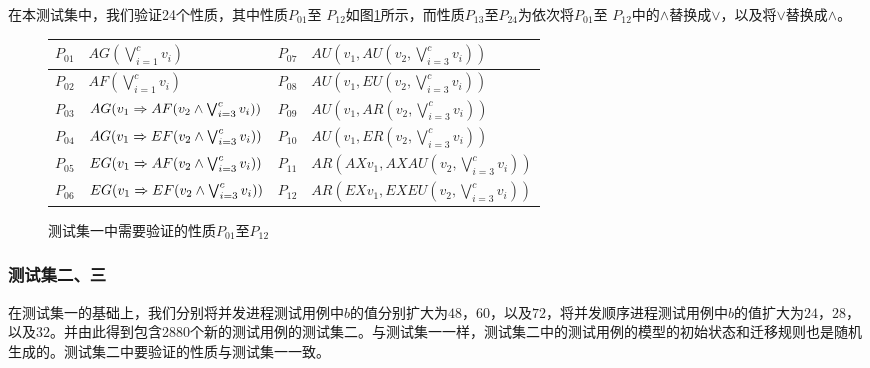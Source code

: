 在本测试集中，我们验证24个\CTL{}性质，其中性质$P_{01}$至 $P_{12}$如图\ref{fig:properties}所示，而性质$P_{13}$至$P_{24}$为依次将$P_{01}$至 $P_{12}$中的$\wedge$替换成$\vee$，以及将$\vee$替换成$\wedge$。


\begin{figure}[!h]
	\centering
	{
		\begin{tabular}{|l|l||l|l|}
			\hline
			$P_{01}$& $AG(\bigvee^c_{i=1}v_i)$ & $P_{07}$& $AU(v_1, AU(v_2, \bigvee^c_{i=3}v_i))$\\
			\hline
			$P_{02}$& $AF(\bigvee^c_{i=1}v_i)$ & $P_{08}$ & $AU(v_1, EU(v_2, \bigvee^c_{i=3}v_i))$\\
			\hline
			$P_{03}$& $AG(v_1 \Rightarrow AF(v_2\wedge \bigvee^c_{i=3}v_i))$ & $P_{09}$& $AU(v_1, AR(v_2, \bigvee^c_{i=3}v_i))$\\
			
			\hline
			$P_{04}$& $AG(v_1 \Rightarrow EF(v_2\wedge \bigvee^c_{i=3}v_i))$ & $P_{10}$& $AU(v_1, ER(v_2, \bigvee^c_{i=3}v_i))$\\
			
			\hline
			$P_{05}$& $EG(v_1 \Rightarrow AF(v_2\wedge \bigvee^c_{i=3}v_i))$ & $P_{11}$& $AR(AX v_1, AX AU(v_2, \bigvee^c_{i=3}v_i))$\\
			
			\hline
			$P_{06}$& $EG(v_1 \Rightarrow EF(v_2\wedge \bigvee^c_{i=3}v_i))$ & $P_{12}$& $AR(EX v_1, EX EU(v_2, \bigvee^c_{i=3}v_i))$\\
			
			\hline
		\end{tabular}
	}
	\caption{测试集一中需要验证的性质$P_{01}$至$P_{12}$}
	\label{fig:properties}
\end{figure}

\subsubsection{测试集二、三}
在测试集一的基础上，我们分别将并发进程测试用例中$b$的值分别扩大为$48$，$60$，以及$72$，将并发顺序进程测试用例中$b$的值扩大为$24$，$28$，以及$32$。并由此得到包含2880个新的测试用例的测试集二。与测试集一一样，测试集二中的测试用例的模型的初始状态和迁移规则也是随机生成的。测试集二中要验证的性质与测试集一一致。

